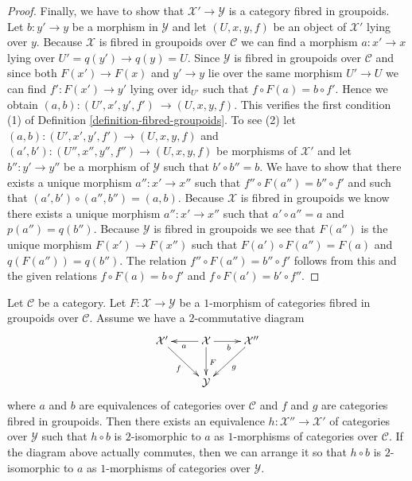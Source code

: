 \begin{proof}
\medskip\noindent
Finally, we have to show that $\mathcal{X}' \to \mathcal{Y}$ is a category
fibred in groupoids. Let $b : y' \to y$ be a morphism in $\mathcal{Y}$
and let $(U, x, y, f)$ be an object of $\mathcal{X}'$ lying over $y$.
Because $\mathcal{X}$ is fibred in groupoids over $\mathcal{C}$ we
can find a morphism $a : x' \to x$ lying over $U' = q(y') \to q(y) = U$.
Since $\mathcal{Y}$ is fibred in groupoids over $\mathcal{C}$ and since
both $F(x') \to F(x)$ and $y' \to y$ lie over the same morphism $U' \to U$
we can find $f' : F(x') \to y'$ lying over $\text{id}_{U'}$ such that
$f \circ F(a) = b \circ f'$. Hence we obtain $(a, b) : (U', x', y', f')\
\to (U, x, y, f)$. This verifies the first condition (1) of
Definition \ref{definition-fibred-groupoids}.
To see (2) let
$(a, b) : (U', x', y', f') \to (U, x, y, f)$ and
$(a', b') : (U'', x'', y'', f'') \to (U, x, y, f)$ be morphisms of
$\mathcal{X}'$ and let $b'' : y' \to y''$ be a morphism of $\mathcal{Y}$
such that $b' \circ b'' = b$. We have to show that there exists
a unique morphism $a'' : x' \to x''$ such that
$f'' \circ F(a'') = b'' \circ f'$ and such that
$(a', b') \circ (a'', b'') = (a, b)$. Because $\mathcal{X}$ is fibred
in groupoids we know there exists a unique morphism
$a'' : x' \to x''$ such that $a' \circ a'' = a$ and $p(a'') = q(b'')$.
Because $\mathcal{Y}$ is fibred in groupoids we see that
$F(a'')$ is the unique morphism $F(x') \to F(x'')$ such that
$F(a') \circ F(a'') = F(a)$ and $q(F(a'')) = q(b'')$. The relation
$f'' \circ F(a'') = b'' \circ f'$ follows from this and the given
relations $f \circ F(a) = b \circ f'$ and $f \circ F(a') = b' \circ f''$.
\end{proof}

\begin{lemma}
\label{lemma-amelioration-unique}
Let $\mathcal{C}$ be a category. Let $F : \mathcal{X} \to \mathcal{Y}$
be a $1$-morphism of categories fibred in groupoids over $\mathcal{C}$.
Assume we have a $2$-commutative diagram
$$
\xymatrix{
\mathcal{X}' \ar[rd]_f &
\mathcal{X} \ar[l]^a \ar[d]^F \ar[r]_b &
\mathcal{X}'' \ar[ld]^g \\
& \mathcal{Y}
}
$$
where $a$ and $b$ are equivalences of categories over $\mathcal{C}$
and $f$ and $g$ are categories fibred in groupoids. Then there exists
an equivalence $h : \mathcal{X}'' \to \mathcal{X}'$ of categories over
$\mathcal{Y}$ such that $h \circ b$ is $2$-isomorphic to $a$ as $1$-morphisms
of categories over $\mathcal{C}$. If the diagram above actually commutes, then
we can arrange it so that $h \circ b$ is $2$-isomorphic to $a$ as
$1$-morphisms of categories over $\mathcal{Y}$.
\end{lemma}

